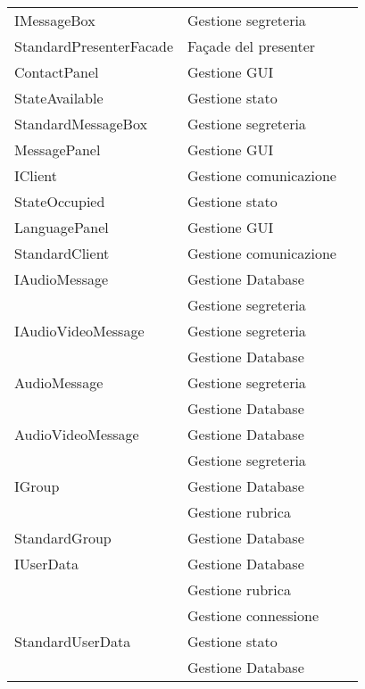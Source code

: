\begin{center}
\begin{longtable}{lp{}l}
IMessageBox & Gestione segreteria \\
StandardPresenterFacade & Façade del presenter \\
ContactPanel & Gestione GUI \\
StateAvailable & Gestione stato \\
StandardMessageBox & Gestione segreteria \\
MessagePanel & Gestione GUI \\
IClient & Gestione comunicazione \\
StateOccupied & Gestione stato \\
LanguagePanel & Gestione GUI \\
StandardClient & Gestione comunicazione \\
IAudioMessage & Gestione Database \\
 & Gestione segreteria \\
IAudioVideoMessage & Gestione segreteria \\
 & Gestione Database \\
AudioMessage & Gestione segreteria \\
 & Gestione Database \\
AudioVideoMessage & Gestione Database \\
 & Gestione segreteria \\
IGroup & Gestione Database \\
 & Gestione rubrica \\
StandardGroup & Gestione Database \\
IUserData & Gestione Database \\
 & Gestione rubrica \\
 & Gestione connessione \\
StandardUserData & Gestione stato \\
 & Gestione Database \\
\bottomrule
\end{longtable}
\end{center}
